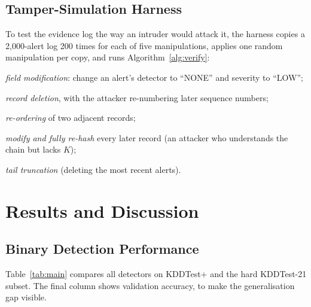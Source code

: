 \documentclass[12pt,a4paper,oneside]{article}
\begin{document}
\subsection{Tamper-Simulation Harness}
To test the evidence log the way an intruder would attack it, the harness copies a 2{,}000-alert log 200 times for each of five manipulations, applies one random manipulation per copy, and runs Algorithm~\ref{alg:verify}:
\begin{enumerate*}[label=(\roman*)]
  \item \emph{field modification}: change an alert's detector to ``NONE'' and severity to ``LOW'';
  \item \emph{record deletion}, with the attacker re-numbering later sequence numbers;
  \item \emph{re-ordering} of two adjacent records;
  \item \emph{modify and fully re-hash} every later record (an attacker who understands the chain but lacks $K$);
  \item \emph{tail truncation} (deleting the most recent alerts).
\end{enumerate*}

\section{Results and Discussion}\label{sec:results}
\subsection{Binary Detection Performance}
Table~\ref{tab:main} compares all detectors on KDDTest+ and the hard KDDTest-21 subset. The final column shows validation accuracy, to make the generalisation gap visible.
\end{document}
